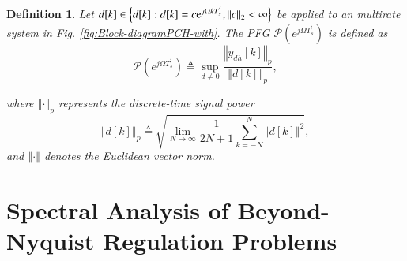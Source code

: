 \documentclass [11pt, proquest] {uwthesis}[2020/02/24]
\newtheorem{definition}{Definition}
\begin{document}
\noindent \begin{definition}\label{-Let-} Let $d[k]\in\left\{ d[k]:d[k]=c\mathrm{e}^{j\Omega kT_{s}^{'}},\left\Vert c\right\Vert _{2}<\infty\right\} $
be applied to an multirate system in Fig. \ref{fig:Block-diagramPCH-with}.
The PFG $\mathcal{P}(e^{j\Omega T_{s}^{'}})$ is defined as
\begin{equation}
\mathcal{P}(e^{j\Omega T_{s}^{'}})\triangleq\sup_{d\neq0}\frac{\left\Vert y_{dh}[k]\right\Vert _{p}}{\left\Vert d[k]\right\Vert _{p}},\label{eq:Performance_freq_gain}
\end{equation}

\noindent where $\left\Vert \cdot\right\Vert _{p}$ represents the
discrete-time signal power
\begin{equation}
\left\Vert d[k]\right\Vert _{p}\triangleq\sqrt{\lim_{N\rightarrow\infty}\frac{1}{2N+1}\sum_{k=-N}^{N}\left\Vert d[k]\right\Vert ^{2}},\label{eq:Power}
\end{equation}
and $\left\Vert \cdot\right\Vert $ denotes the Euclidean vector norm.\end{definition}

\section{\label{sec:Main-results}Spectral Analysis of Beyond-Nyquist Regulation
Problems}
\end{document}
